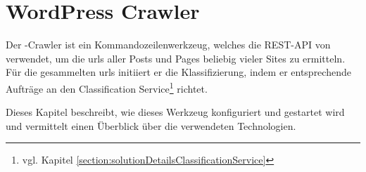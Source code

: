 \section{WordPress Crawler}
    \label{section:solutionDetailsCrawler}
    Der {\wordpress}-Crawler ist ein Kommandozeilenwerkzeug,
    welches die REST-API von {\wordpress} verwendet,
    um die \glspl{url} aller Posts und Pages beliebig vieler Sites zu ermitteln.
    Für die gesammelten \glspl{url} initiiert er die Klassifizierung,
    indem er entsprechende Aufträge an den
    Classification Service\footnote{vgl. Kapitel \ref{section:solutionDetailsClassificationService}}
    richtet.
    
    Dieses Kapitel beschreibt, wie dieses Werkzeug konfiguriert und gestartet wird
    und vermittelt einen Überblick über die verwendeten Technologien.

    
    
